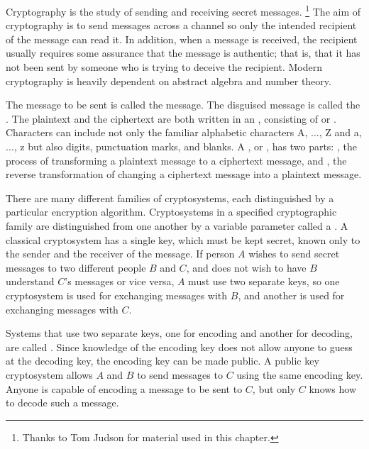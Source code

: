 
Cryptography is the study of sending and receiving secret messages.
\footnote{Thanks to Tom Judson for material used in this chapter.}
The aim of cryptography is to send messages across a channel so only
the intended recipient of the message can read it. In addition, when a
message is received, the recipient usually requires some assurance that
the message is authentic; that is, that it has not been sent by
someone who is trying to deceive the recipient. Modern cryptography is
heavily dependent on abstract algebra and number theory. 
 
 
The message to be sent is called the  message. The disguised message is called
the . The plaintext and the
ciphertext are both written in an , consisting of  or . Characters can include not only the
familiar alphabetic characters A, $\ldots$, Z and a, $\ldots$, z but
also digits, punctuation marks, and blanks. A , or ,  has two parts: , the process
of transforming a plaintext message to a ciphertext message, and , the reverse transformation of changing a ciphertext
message into a plaintext message.
 
 
There are many different families of cryptosystems, each distinguished
by a particular encryption algorithm. Cryptosystems in a specified
cryptographic family are distinguished from one another by a variable parameter
called a . A classical cryptosystem has a single key, which must be kept
secret,  known only to the sender and the receiver of the message. If
person $A$ wishes to send secret messages to two different people $B$
and $C$, and does not wish to have $B$ understand $C$'s messages or
vice versa, $A$ must use two separate keys, so one cryptosystem is
used for exchanging messages with $B$, and another is used for
exchanging messages with $C$.
 
 
Systems that use two separate keys, one for encoding and another for
decoding, are called . Since
knowledge of the encoding key does not allow anyone to guess at the
decoding key, the encoding key can be made public. A public key
cryptosystem allows $A$ and $B$ to send messages to $C$ using the same
encoding key.  Anyone is capable of encoding a message to be sent to
$C$, but only $C$ knows how to decode such a message.
 
